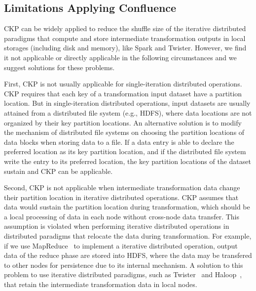 \documentclass[10pt,journal,compsoc]{IEEEtran}
\begin{document}
\subsection{Limitations Applying Confluence}\label{section:limitation}
CKP can be widely applied to reduce the shuffle size of the iterative
distributed paradigms that compute and store intermediate transformation outputs in
local storages (including disk and memory), like Spark and Twister.
However, we find it not applicable or directly applicable in the following 
circumstances and we suggest solutions for these problems.

First, CKP is not usually applicable for single-iteration distributed operations. 
CKP requires that each key of a transformation input dataset have a partition location. 
But in single-iteration distributed operations, input datasets are usually attained 
from a distributed file system (e.g., HDFS), where data locations are not organized by their key partition locations. 
An alternative solution is to modify the mechanism of distributed file systems on choosing the
partition locations of data blocks when storing data to a file.
If a data entry is able to declare the preferred location as its key partition location, and if the distributed file system write the entry to its preferred location, the key partition locations of the dataset sustain and CKP can be applicable. 

Second, CKP is not applicable when intermediate transformation data change
their partition location in iterative distributed operations. 
CKP assumes that data would sustain the partition location during 
transformation, which should be a local processing of data in each node 
without cross-node data transfer.
This assumption is violated when performing iterative distributed operations
in distributed paradigms that relocate the data during transformation. 
For example, if we use MapReduce~\cite{dean2008mapreduce} to implement a iterative distributed operation, output data of the reduce phase are 
stored into HDFS, where the data may be transfered to other nodes for persistence due to its internal mechanism. 
A solution to this problem to use iterative distributed paradigms, such as Twister~\cite{ekanayake2010twister} and Haloop~\cite{bu2010haloop}, that retain the intermediate transformation data in local nodes. 
\end{document}
